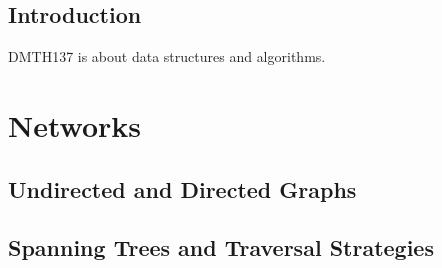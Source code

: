 %
\maketitle
%
%
\section{Introduction}
\label{sec:Introduction}
DMTH137 is about data structures and algorithms.
\tableofcontents
%
\newpage

\chapter{Networks}
\label{chap:Networks}
\section{Undirected and Directed Graphs}
\label{sec:UndirectedAndDirectedGraphs}
\lipsum[1]

\section{Spanning Trees and Traversal Strategies}
\label{chap:SpanningTreesAndTraversalStrategies}
